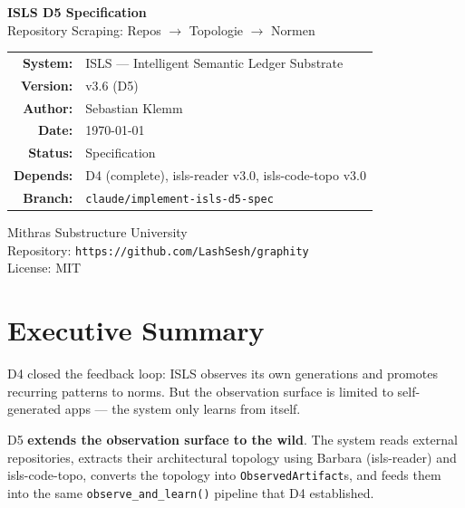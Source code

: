 \documentclass[11pt,a4paper]{article}
\begin{document}
\begin{titlepage}
\centering
\vspace*{3cm}

{\Huge\bfseries\color{isls-blue} ISLS D5 Specification}\\[0.5cm]
{\LARGE\color{isls-orange} Repository Scraping: Repos $\to$ Topologie $\to$ Normen}\\[2cm]

{\large
\begin{tabular}{rl}
\textbf{System:}    & ISLS --- Intelligent Semantic Ledger Substrate \\
\textbf{Version:}   & v3.6 (D5) \\
\textbf{Author:}    & Sebastian Klemm \\
\textbf{Date:}      & \today \\
\textbf{Status:}    & Specification \\
\textbf{Depends:}   & D4 (complete), isls-reader v3.0, isls-code-topo v3.0 \\
\textbf{Branch:}    & \texttt{claude/implement-isls-d5-spec} \\
\end{tabular}
}

\vfill

{\small\color{isls-gray}
Mithras Substructure University\\
Repository: \texttt{https://github.com/LashSesh/graphity}\\
License: MIT
}
\end{titlepage}

\tableofcontents
\newpage

\section{Executive Summary}

D4 closed the feedback loop: ISLS observes its own generations and promotes
recurring patterns to norms. But the observation surface is limited to
self-generated apps --- the system only learns from itself.

D5 \textbf{extends the observation surface to the wild}. The system reads
external repositories, extracts their architectural topology using Barbara
(isls-reader) and isls-code-topo, converts the topology into
\texttt{ObservedArtifact}s, and feeds them into the same
\texttt{observe\_and\_learn()} pipeline that D4 established.
\end{document}
